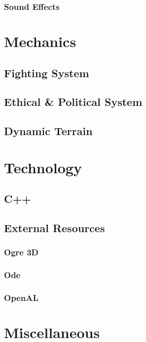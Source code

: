 \documentclass[a4paper]{report}
\begin{document}
		\section{Sound Effects}

\part{Mechanics}

	\chapter{Fighting System}

	\chapter{Ethical \& Political System}

	\chapter{Dynamic Terrain}

\part{Technology}

	\chapter{C++}

	\chapter{External Resources}

		\section{Ogre 3D}

		\section{Ode}

		\section{OpenAL}

\part{Miscellaneous}
\end{document}
